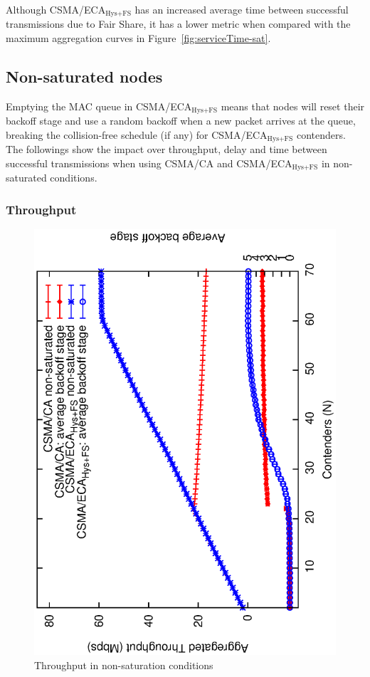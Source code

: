 \documentclass[a4paper,journal]{IEEEtran}
\begin{document}
	Although CSMA/ECA$_{\text{Hys+FS}}$ has an increased average time between successful transmissions due to Fair Share, it has a lower metric when compared with the maximum aggregation curves in Figure~\ref{fig:serviceTime-sat}.


	\subsection{Non-saturated nodes}\label{resultsUnsaturated}
	Emptying the MAC queue in CSMA/ECA$_{\text{Hys+FS}}$ means that nodes will reset their backoff stage and use a random backoff when a new packet arrives at the queue, breaking the collision-free schedule (if any) for CSMA/ECA$_{\text{Hys+FS}}$ contenders. The followings show the impact over throughput, delay and time between successful transmissions when using CSMA/CA and CSMA/ECA$_{\text{Hys+FS}}$ in non-saturated conditions.\\
	
	\subsubsection{Throughput}
	
   	\begin{figure}[tb]
		\centering
		\includegraphics[width=0.7\linewidth,angle=-90]{figures/unsaturated/throughput-unsaturated/throughput-unsaturated-w-BOS.eps}
		\caption{Throughput in non-saturation conditions}
		\label{fig:throughputUnsat}
	\end{figure}
	
\end{document}
